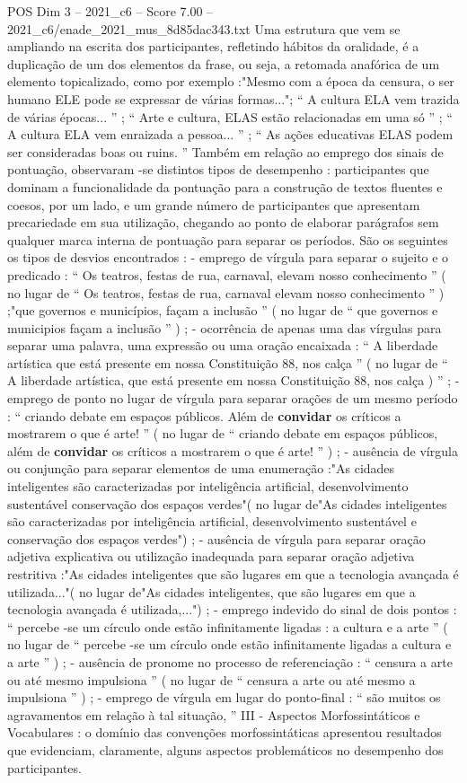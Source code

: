 \begin{textsample}{POS Dim 3 – 2021\_c6 – Score 7.00 – 2021\_c6/enade\_2021\_mus\_8d85dac343.txt}
Uma estrutura que vem se ampliando na escrita dos participantes, refletindo hábitos da oralidade, é a duplicação de um dos elementos da frase, ou seja, a retomada anafórica de um elemento topicalizado, como por exemplo :"Mesmo com a época da censura, o ser humano ELE pode se expressar de várias formas..."; “ A cultura ELA vem trazida de várias épocas... ” ; “ Arte e cultura, ELAS estão relacionadas em uma só ” ; “ A cultura ELA vem enraizada a pessoa... ” ; “ As ações educativas ELAS podem ser consideradas boas ou ruins. ” Também em relação ao emprego dos sinais de pontuação, observaram -se distintos tipos de desempenho : participantes que dominam a funcionalidade da pontuação para a construção de textos fluentes e coesos, por um lado, e um grande número de participantes que apresentam precariedade em sua utilização, chegando ao ponto de elaborar parágrafos sem qualquer marca interna de pontuação para separar os períodos.
São os seguintes os tipos de desvios encontrados : - emprego de vírgula para separar o sujeito e o predicado : “ Os teatros, festas de rua, carnaval, elevam nosso conhecimento ” ( no lugar de “ Os teatros, festas de rua, carnaval elevam nosso conhecimento ” ) ;"que governos e municípios, façam a inclusão ” ( no lugar de “ que governos e municipios façam a inclusão ” ) ; - ocorrência de apenas uma das vírgulas para separar uma palavra, uma expressão ou uma oração encaixada : “ A liberdade artística que está presente em nossa Constituição 88, nos calça ” ( no lugar de “ A liberdade artística, que está presente em nossa Constituição 88, nos calça ) ” ; - emprego de ponto no lugar de vírgula para separar orações de um mesmo período : “ criando debate em espaços públicos.
Além de \textbf{convidar} os críticos a mostrarem o que é arte! ” ( no lugar de “ criando debate em espaços públicos, além de \textbf{convidar} os críticos a mostrarem o que é arte! ” ) ; - ausência de vírgula ou conjunção para separar elementos de uma enumeração :"As cidades inteligentes são caracterizadas por inteligência artificial, desenvolvimento sustentável conservação dos espaços verdes"( no lugar de"As cidades inteligentes são caracterizadas por inteligência artificial, desenvolvimento sustentável e conservação dos espaços verdes") ; - ausência de vírgula para separar oração adjetiva explicativa ou utilização inadequada para separar oração adjetiva restritiva :"As cidades inteligentes que são lugares em que a tecnologia avançada é utilizada..."( no lugar de"As cidades inteligentes, que são lugares em que a tecnologia avançada é utilizada,...") ; - emprego indevido do sinal de dois pontos : “ percebe -se um círculo onde estão infinitamente ligadas : a cultura e a arte ” ( no lugar de “ percebe -se um círculo onde estão infinitamente ligadas a cultura e a arte ” ) ; - ausência de pronome no processo de referenciação : “ censura a arte ou até mesmo impulsiona ” ( no lugar de “ censura a arte ou até mesmo a impulsiona ” ) ; - emprego de vírgula em lugar do ponto-final : “ são muitos os agravamentos em relação à tal situação, ” III - Aspectos Morfossintáticos e Vocabulares : o domínio das convenções morfossintáticas apresentou resultados que evidenciam, claramente, alguns aspectos problemáticos no desempenho dos participantes.

\end{textsample}
